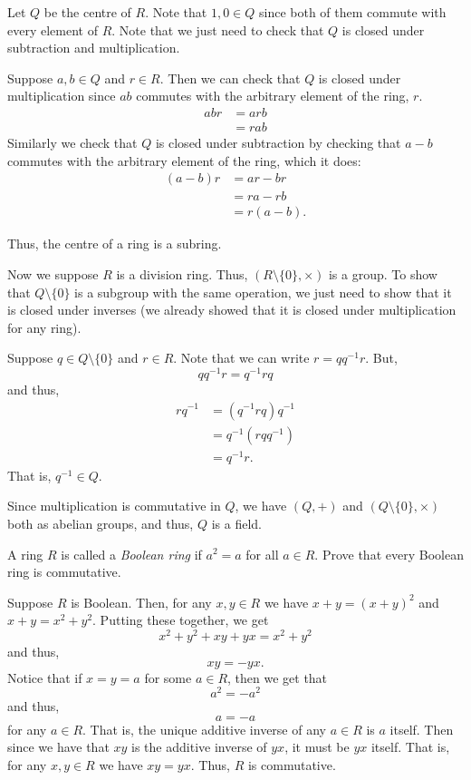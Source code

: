 \documentclass[12 pt, letterpaper]{hmcpset}
\begin{document}
\begin{solution}
	Let $Q$ be the centre of $R$. Note that $1, 0 \in Q$ since both of them commute with every element of $R$. Note that we just need to check that $Q$ is closed under subtraction and multiplication. 

	Suppose $a, b \in Q$ and $r \in R$. Then we can check that $Q$ is closed under multiplication since $ab$ commutes with the arbitrary element of the ring, $r$.
	\[
		\begin{split}
			a b r & = a r b \\
			      & = r a b
		\end{split}
	\]
	Similarly we check that $Q$ is closed under subtraction by checking that $a - b$ commutes with the arbitrary element of the ring, which it does:
	\[
		\begin{split}
			(a - b) r & = a r - b r \\
				  & = r a - r b \\
				  & = r (a - b).
		\end{split}
	\] 

	Thus, the centre of a ring is a subring.

	Now we suppose $R$ is a division ring. Thus, $(R \setminus \{ 0 \}, \times)$ is a group. To show that $Q \setminus \{ 0 \}$ is a subgroup with the same operation, we just need to show that it is closed under inverses (we already showed that it is closed under multiplication for any ring). 

	Suppose $q \in Q \setminus \{ 0 \}$ and $r \in R$. Note that we can write $r = q q^{-1} r$. But,
	\[
		q q^{-1} r = q^{-1} r q
	\]
	and thus,
	\[
		\begin{split}
			r q^{-1} & = (q^{-1} r q) q^{-1} \\
				 & = q^{-1}(r q q^{-1}) \\
				 & = q^{-1} r.
		\end{split}
	\]
	That is, $q^{-1} \in Q$. 

	Since multiplication is commutative in $Q$, we have $(Q, +)$ and $(Q \setminus \{ 0 \}, \times)$ both as abelian groups, and thus, $Q$ is a field.
\end{solution}

\pagebreak

\begin{problem}
	A ring $R$ is called a \textit{Boolean ring} if $a^2 = a$ for all $a \in R$. Prove that every Boolean ring is commutative.
\end{problem}

\begin{solution}
	Suppose $R$ is Boolean. Then, for any $x, y \in R$ we have $x + y = (x + y)^2$ and $x + y = x^2 + y^2$. Putting these together, we get
	\[
		x^2 + y^2 + xy + yx = x^2 + y^2
	\]
	and thus,
	\[
		xy = - yx.
	\]
	Notice that if $x = y = a$ for some $a \in R$, then we get that
	\[
		a^2 = - a^2
	\]
	and thus,
	\[
		a = - a
	\]
	for any $a \in R$. That is, the unique additive inverse of any $a \in R$ is $a$ itself. Then since we have that $xy$ is the additive inverse of $yx$, it must be $yx$ itself. That is, for any $x, y \in R$ we have $xy = yx$. Thus, $R$ is commutative.
\end{solution}
\end{document}
